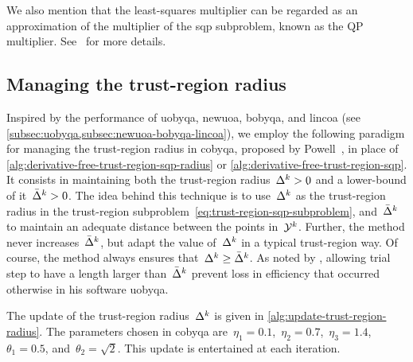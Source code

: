 We also mention that the least-squares multiplier can be regarded as an approximation of the multiplier of the \gls{sqp} subproblem, known as the QP multiplier.
See~\cite[pp.~538--539]{Nocedal_Wright_2006} for more details.

\subsection{Managing the trust-region radius}
\label{subsec:managing-trust-region-radius}

Inspired by the performance of \gls{uobyqa}, \gls{newuoa}, \gls{bobyqa}, and \gls{lincoa} (see \cref{subsec:uobyqa,subsec:newuoa-bobyqa-lincoa}), we employ the following paradigm for managing the trust-region radius in \gls{cobyqa}, proposed by Powell~\cite{Powell_2002,Powell_2006,Powell_2009}, in place of \cref{alg:derivative-free-trust-region-sqp-radius} or \cref{alg:derivative-free-trust-region-sqp}.
It consists in maintaining both the trust-region radius~$\rad[k] > 0$ and a lower-bound of it~$\radlb[k] > 0$.
The idea behind this technique is to use~$\rad[k]$ as the trust-region radius in the trust-region subproblem~\cref{eq:trust-region-sqp-subproblem}, and~$\radlb[k]$ to maintain an adequate distance between the points in~$\xpt[k]$.
Further, the method never increases~$\radlb[k]$, but adapt the value of~$\rad[k]$ in a typical trust-region way.
Of course, the method always ensures that~$\rad[k] \ge \radlb[k]$.
As noted by \citeauthor{Powell_2002}, allowing trial step to have a length larger than~$\radlb[k]$ prevent loss in efficiency that occurred otherwise in his software \gls{uobyqa}.

The update of the trust-region radius~$\rad[k]$ is given in \cref{alg:update-trust-region-radius}.
The parameters chosen in \gls{cobyqa} are~$\eta_1 = 0.1$,~$\eta_2 = 0.7$,~$\eta_3 = 1.4$,~$\theta_1 = 0.5$, and~$\theta_2 = \sqrt{2}$.
This update is entertained at each iteration.

